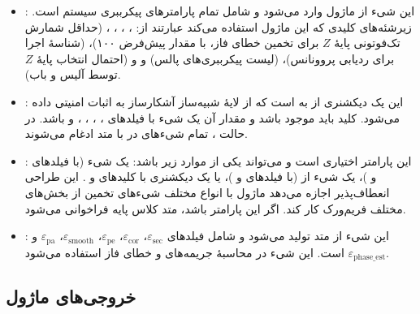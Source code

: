 \begin{itemize}
	\item {}: این شیء از ماژول  وارد می‌شود و شامل تمام پارامترهای پیکرببری سیستم است. زیرشئه‌های کلیدی که این ماژول استفاده می‌کند عبارتند از: ، ، ، ،  (حداقل شمارش تک‌فوتونی پایۀ $Z$ برای تخمین خطای فاز، با مقدار پیش‌فرض ۱۰۰)،  (شناسۀ اجرا برای ردیابی پروونانس)،  (لیست پیکرببری‌های پالس) و  و  (احتمال انتخاب پایۀ $Z$ توسط آلیس و باب).
	\item {}: این یک دیکشنری از  به  است که از لایۀ شبیه‌ساز آشکارساز به اثبات امنیتی داده می‌شود. کلید  باید موجود باشد و مقدار آن یک شیء  با فیلدهای ، ، ، ،  و  باشد. در حالت ، تمام شیءهای  در  با متد  ادغام می‌شوند.
	\item {}: این پارامتر اختیاری است و می‌تواند یکی از موارد زیر باشد: یک شیء  (با فیلدهای  و )، یک شیء  از  (با فیلدهای  و )، یا یک دیکشنری با کلیدهای  و . این طراحی انعطاف‌پذیر اجازه می‌دهد ماژول با انواع مختلف شیءهای تخمین  از بخش‌های مختلف فریم‌ورک کار کند. اگر این پارامتر  باشد، متد کلاس پایه فراخوانی می‌شود.
	\item {}: این شیء از متد  تولید می‌شود و شامل فیلدهای $\varepsilon_{\text{sec}}$، $\varepsilon_{\text{cor}}$، $\varepsilon_{\text{pe}}$، $\varepsilon_{\text{smooth}}$، $\varepsilon_{\text{pa}}$ و $\varepsilon_{\text{phase\_est}}$ است. این شیء در محاسبۀ جریمه‌های  و خطای فاز استفاده می‌شود.
\end{itemize}

\subsection{خروجی‌های ماژول}

